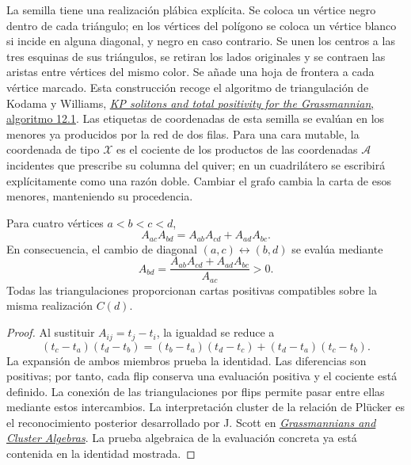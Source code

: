 La semilla tiene una realización plábica explícita. Se coloca un vértice
negro dentro de cada triángulo; en los vértices del polígono se coloca un
vértice blanco si incide en alguna diagonal, y negro en caso contrario.
Se unen los centros a las tres esquinas de sus triángulos, se retiran los
lados originales y se contraen las aristas entre vértices del mismo color.
Se añade una hoja de frontera a cada vértice marcado. Esta construcción
recoge el algoritmo de triangulación de Kodama y Williams,
\href{https://people.math.harvard.edu/~williams/papers/KW-ArxivVersion.pdf}
{\emph{KP solitons and total positivity for the Grassmannian}, algoritmo 12.1}.
Las etiquetas de coordenadas de esta semilla se evalúan en los menores ya
producidos por la red de dos filas. Para una cara mutable, la coordenada
de tipo \(\mathcal X\) es el cociente de los productos de las
coordenadas \(\mathcal A\) incidentes que prescribe su columna del
quiver; en un cuadrilátero se escribirá explícitamente como una razón
doble. Cambiar el grafo cambia la carta de esos menores, manteniendo su
procedencia.

\begin{theorem}
\label{thm:nc-ptolemy}
Para cuatro vértices \(a<b<c<d\),
\begin{equation}
 A_{ac}A_{bd}=A_{ab}A_{cd}+A_{ad}A_{bc}.
 \label{eq:nc-ptolemy}
\end{equation}
En consecuencia, el cambio de diagonal \((a,c)\leftrightarrow(b,d)\)
se evalúa mediante
\[
 A_{bd}=\frac{A_{ab}A_{cd}+A_{ad}A_{bc}}{A_{ac}}>0.
\]
Todas las triangulaciones proporcionan cartas positivas compatibles sobre
la misma realización \(C(d)\).
\end{theorem}
\begin{proof}
Al sustituir \(A_{ij}=t_j-t_i\), la igualdad se reduce a
\[
 (t_c-t_a)(t_d-t_b)
 =(t_b-t_a)(t_d-t_c)+(t_d-t_a)(t_c-t_b).
\]
La expansión de ambos miembros prueba la identidad. Las diferencias son
positivas; por tanto, cada flip conserva una evaluación positiva y el
cociente está definido. La conexión de las triangulaciones por flips
permite pasar entre ellas mediante estos intercambios. La interpretación
cluster de la relación de Plücker es el reconocimiento posterior desarrollado
por J. Scott en
\href{https://arxiv.org/abs/math/0311148}{\emph{Grassmannians and Cluster
Algebras}}. La prueba algebraica de la evaluación concreta ya está contenida
en la identidad mostrada.
\end{proof}

